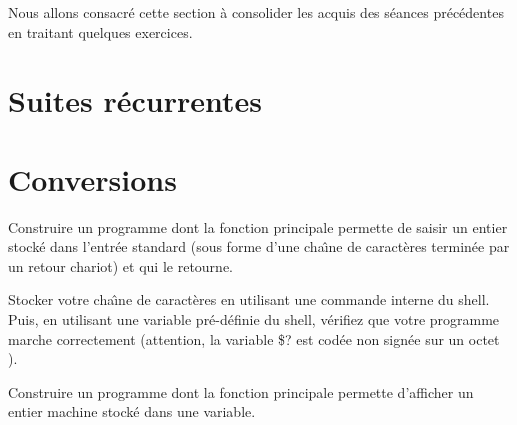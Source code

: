 Nous allons consacr\'e  cette section  \`a  consolider les acquis  des
s\'eances pr\'ec\'edentes en traitant quelques exercices.

\section{Suites r\'ecurrentes}
\label{sec:SuitesRecurrentes}


\section{Conversions}
\label{sec:Conversions}
\begin{exercice} 
\label{sec:getchar}
Construire un programme dont la fonction principale permette de saisir
un entier stock\'e dans l'entr\'ee standard (sous forme d'une
cha\^\i{}ne de caract\`eres termin\'ee par un retour chariot) et qui
le retourne.
\ifcorrection
\begin{correction}

\end{correction}
\fi 
Stocker votre cha\^\i{}ne de caract\`eres en utilisant une commande
interne du shell.  Puis, en utilisant une variable pr\'e-d\'efinie du
shell, v\'erifiez que votre programme marche correctement (attention,
la variable \$? est cod\'ee non sign\'ee sur un octet ).
\end{exercice}

\begin{exercice} 
Construire un programme dont la fonction principale permette d'afficher
un entier machine stock\'e dans une variable.
\ifcorrection
\begin{correction}

\end{correction}
\fi 
\end{exercice}

